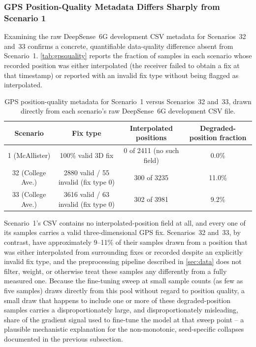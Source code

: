 \documentclass{iutbscthesis}
\begin{document}
\subsubsection{GPS Position-Quality Metadata Differs Sharply from Scenario 1}

Examining the raw DeepSense~6G development CSV metadata for Scenarios~32 and~33 confirms a concrete, quantifiable data-quality difference absent from Scenario~1. \autoref{tab:gpsquality} reports the fraction of samples in each scenario whose recorded position was either interpolated (the receiver failed to obtain a fix at that timestamp) or reported with an invalid fix type without being flagged as interpolated.

\begin{table}[H]
    \centering
    \begin{tabular}{c c c c}
        \toprule
        Scenario & Fix type & Interpolated positions & Degraded-position fraction \\
        \midrule
        1 (McAllister) & 100\% valid 3D fix & 0 of 2411 (no such field) & 0.0\% \\
        32 (College Ave.) & 2880 valid / 55 invalid (fix type 0) & 300 of 3235 & 11.0\% \\
        33 (College Ave.) & 3616 valid / 63 invalid (fix type 0) & 302 of 3981 & 9.2\% \\
        \bottomrule
    \end{tabular}
    \caption{GPS position-quality metadata for Scenario~1 versus Scenarios~32 and~33, drawn directly from each scenario's raw DeepSense~6G development CSV file.}
    \label{tab:gpsquality}
\end{table}

Scenario~1's CSV contains no interpolated-position field at all, and every one of its samples carries a valid three-dimensional GPS fix. Scenarios~32 and~33, by contrast, have approximately 9--11\% of their samples drawn from a position that was either interpolated from surrounding fixes or recorded despite an explicitly invalid fix type, and the preprocessing pipeline described in \autoref{sec:data} does not filter, weight, or otherwise treat these samples any differently from a fully measured one. Because the fine-tuning sweep at small sample counts (as few as five samples) draws directly from this pool without regard to position quality, a small draw that happens to include one or more of these degraded-position samples carries a disproportionately large, and disproportionately misleading, share of the gradient signal used to fine-tune the model at that sweep point -- a plausible mechanistic explanation for the non-monotonic, seed-specific collapses documented in the previous subsection.
\end{document}
